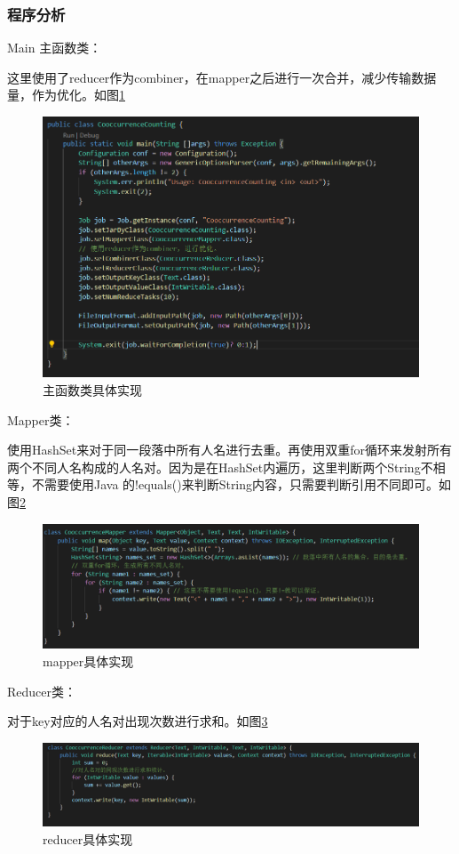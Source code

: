 \documentclass[a4paper,UTF8]{article}
\numberwithin{equation}{section}
\begin{document}
\subsubsection{程序分析}
Main 主函数类：
\par 这里使用了reducer作为combiner，在mapper之后进行一次合并，减少传输数据量，作为优化。如图\ref{task2-Main}
\begin{figure}[htbp]
	\centering
	\includegraphics[width = 15cm]{task2-Main.png}
	\caption{主函数类具体实现}
	\label{task2-Main}
\end{figure}

\par Mapper类：
\par 使用HashSet来对于同一段落中所有人名进行去重。再使用双重for循环来发射所有两个不同人名构成的人名对。因为是在HashSet内遍历，这里判断两个String不相等，不需要使用Java 的!equals()来判断String内容，只需要判断引用不同即可。如图\ref{task2-mapper}
\begin{figure}[htbp]
	\centering
	\includegraphics[width = 15cm]{task2-mapper.png}
	\caption{mapper具体实现}
	\label{task2-mapper}
\end{figure}

\par Reducer类：
\par 对于key对应的人名对出现次数进行求和。如图\ref{task2-reducer}
\begin{figure}[htbp]
	\centering
	\includegraphics[width = 15cm]{task2-reducer.png}
	\caption{reducer具体实现}
	\label{task2-reducer}
\end{figure}
\end{document}
